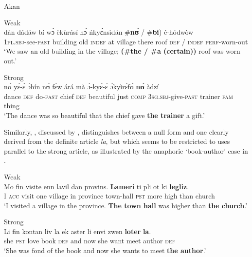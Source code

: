 \documentclass[output=paper
,modfonts
,nonflat]{langscibook}
\begin{document}
{\begin{exe}
\ex\label{ex:schwarz:15} Akan \citep[14--15]{ArkohMatthewson2013}
\begin{xlist}
\ex\label{ex:schwarz:15a} Weak\\  {d\`an} {d\'ad\'aw} {b\'i} {w\`ɔ}
{\`ek\`ur\'as\'i} {h\'ɔ} {\'nky\'ɛns\`id\'an}
{\op}\textnormal{\#}\textbf{n\'ʊ} \textnormal{/} \textnormal{\#}\textbf{bi}) {\'e-h\'odw\`ow}\\
1\textsc{pl.sbj}-see-\textsc{past} building old \textsc{indef} at village there roof {\phantom{\#}}\textsc{def} / {\phantom{\#}}{\textsc{indef}} \textsc{perf}-worn-out\\
\glt `We saw an old building in the village; \textbf{(\#the / \#a (certain))}
roof was worn out.'

\ex\label{ex:schwarz:15b} Strong\\ 
 {n\'ʊ} {y\'ɛ-\`ɛ}
{\`ɔh\'in} {n\'ʊ} {f\`ɛw} {\'ar\'a}
{m\`a} {\`ɔ-ky\'ɛ-\`ɛ} {\`ɔky\`ir\'ɛf\'ʊ} \textbf{n\'ʊ} {\`adz\'i}\\
dance \textsc{def} do-\textsc{past} chief \textsc{def} beautiful just \textsc{comp} 3\textsc{sg.sbj}-give-\textsc{past}
trainer \textsc{fam} thing\\
\glt `The dance was so beautiful that the chief gave \textbf{the trainer} a gift.'
\end{xlist}
\end{exe}}

\hspace*{-0.55226pt}Similarly, , discussed by \citet{Wespel2008}, distinguishes between a null form  and one clearly derived
from the  definite article \textit{la}, but which seems to be
restricted to uses parallel to the strong article,
as illustrated by the anaphoric `book-author'  case in .

\begin{exe}
\ex\label{ex:schwarz:16}
\begin{xlist}
\ex\label{ex:schwarz:16a} 
Weak\\ \gll Mo fin visite enn lavil dan provins. \textbf{Lameri} ti pli ot ki \textbf{legliz}.\\
 I \textsc{acc} visit one village in province {town-hall} \textsc{pst} more high than {church}\\
\glt `I visited a village in the province. \textbf{The town hall} was higher than \textbf{the church}.'
 
\ex\label{ex:schwarz:16b}
Strong\\ \gll Li fin kontan liv la ek aster li envi zwen \textbf{loter} \textbf{la}.\\
she \textsc{pst} love	book \textsc{def} and now she want meet {author} {\textsc{def}}\\
\glt `She was fond of the book and now she wants to meet \textbf{the author}.'

\end{xlist}
\end{exe}
\end{document}
